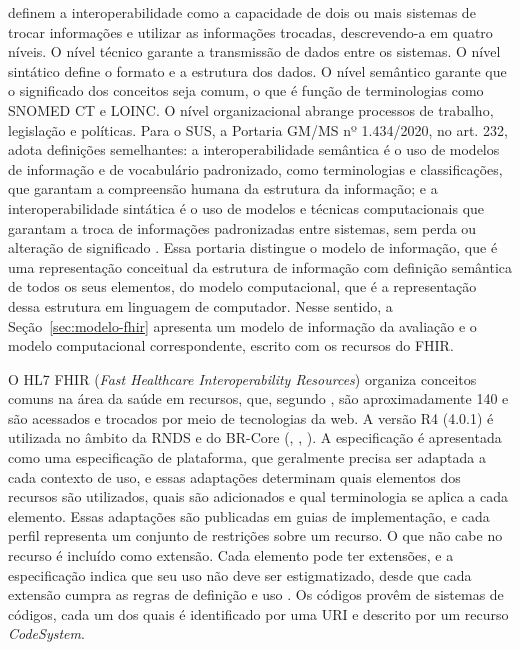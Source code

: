  definem a interoperabilidade como a capacidade de dois ou mais sistemas de
trocar informações e utilizar as informações trocadas, descrevendo-a em quatro níveis. O nível técnico garante a
transmissão de dados entre os sistemas. O nível sintático define o formato e a estrutura dos dados. O nível semântico
garante que o significado dos conceitos seja comum, o que é função de terminologias como SNOMED CT e LOINC. O nível
organizacional abrange processos de trabalho, legislação e políticas. Para o SUS, a Portaria GM/MS nº 1.434/2020, no
art. 232, adota definições semelhantes: a interoperabilidade semântica é o uso de modelos de informação e de
vocabulário padronizado, como terminologias e classificações, que garantam a compreensão humana da estrutura da
informação; e a interoperabilidade sintática é o uso de modelos e técnicas computacionais que garantam a troca de
informações padronizadas entre sistemas, sem perda ou alteração de significado \cite{portaria1434:2020}. Essa
portaria distingue o modelo de informação, que é uma representação conceitual da estrutura de informação com
definição semântica de todos os seus elementos, do modelo computacional, que é a representação dessa estrutura em
linguagem de computador. Nesse sentido, a Seção~\ref{sec:modelo-fhir} apresenta um modelo de informação da avaliação
e o modelo computacional correspondente, escrito com os recursos do FHIR.

O HL7 FHIR (\textit{Fast Healthcare Interoperability Resources}) organiza conceitos comuns na área da saúde em
recursos, que, segundo , são aproximadamente 140 e são acessados e trocados por
meio de tecnologias da web. A versão R4 (4.0.1) é utilizada no âmbito da RNDS e do BR-Core
(\citeauthor{brcore2026}, \citeyear{brcore2026}, \citeyear{rnds2026guia}). A especificação é apresentada como uma
especificação de plataforma, que geralmente precisa ser adaptada a cada contexto de uso, e essas adaptações
determinam quais elementos dos recursos são utilizados, quais são adicionados e qual terminologia se aplica a cada
elemento. Essas adaptações são publicadas em guias de implementação, e cada perfil representa um conjunto de
restrições sobre um recurso. O que não cabe no recurso é incluído como extensão. Cada elemento pode ter extensões, e
a especificação indica que seu uso não deve ser estigmatizado, desde que cada extensão cumpra as regras de definição
e uso \cite{hl7fhirR4}. Os códigos provêm de sistemas de códigos, cada um dos quais é identificado por uma URI e
descrito por um recurso \textit{CodeSystem}.

